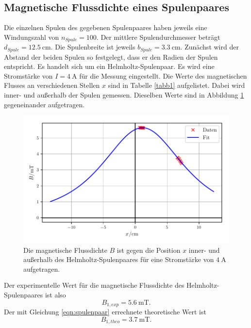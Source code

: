 \subsection{Magnetische Flussdichte eines Spulenpaares}
Die einzelnen Spulen des gegebenen Spulenpaares haben jeweils
eine Windungszahl von $n_{Spule} = \num{100}$. Der mittlere
Spulendurchmesser beträgt $d_{Spule} = \SI{12.5}{\centi\meter}$.
Die Spulenbreite ist jeweils $b_{Spule} = \SI{3.3}{\centi\meter}$.%
\newline
Zunächst wird der Abstand der beiden Spulen so festgelegt, dass
er den Radien der Spulen entspricht. Es handelt sich um ein
Helmholtz-Spulenpaar.
Es wird eine Stromstärke von $I = \SI{4}{\ampere}$ für die
Messung eingestellt.
Die Werte des magnetischen Flusses an verschiedenen Stellen
$x$ sind in Tabelle \ref{tabb1} aufgelistet. Dabei wird inner-
und außerhalb der Spulen gemessen.
Dieselben Werte sind in Abbildung \ref{plotb1} gegeneinander
aufgetragen.


\begin{figure}
    \centering
    \includegraphics{build/plotb1.pdf}
    \caption{Die magnetische Flussdichte $B$ ist gegen die Position $x$ inner-
    und außerhalb des Helmholtz-Spulenpaares für eine Stromstärke von
    $\SI{4}{\ampere}$ aufgetragen.}
    \label{plotb1}
\end{figure}

\noindent Der experimentelle Wert für die magnetische Flussdichte
des Helmholtz-Spulenpaares ist also
\begin{equation*}
   B_{1,exp} = \SI{5.6}{\milli\tesla}.
\end{equation*}
Der mit Gleichung \eqref{eqn:spulenpaar} errechnete theoretische
Wert ist 
\begin{equation*}
   B_{1,theo} = \SI{3.7}{\milli\tesla}.
\end{equation*}

